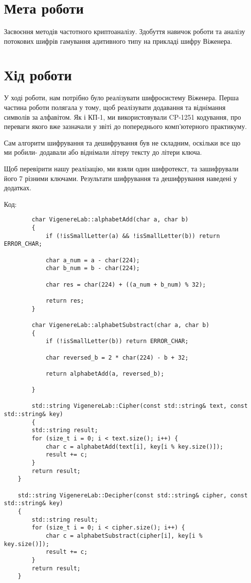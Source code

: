 \documentclass[12pt]{article}
\begin{document}


\section{Мета роботи}

Засвоєння методів частотного криптоаналізу. Здобуття навичок роботи та аналізу
потокових шифрів гамування адитивного типу на прикладі шифру Віженера.

\section{Хід роботи}

У ході роботи, нам потрібно було реалізувати шифросистему Віженера.
Перша частина роботи полягала у тому, щоб реалізувати додавання та віднімання
символів за алфавітом. Як і КП-1, ми використовували CP-1251 кодування, про переваги
якого вже зазначали у звіті до попереднього комп'ютерного практикуму.

Сам алгоритм шифрування та дешифрування був не складним, оскільки все що ми робили-
додавали або віднімали літеру тексту до літери ключа.

Щоб перевірити нашу реалізацію, ми взяли один шифротекст, та зашифрували його
7 різними ключами. Результати шифрування та дешифрування наведені у додатках.

Код:

\begin{verbatim}
        char VigenereLab::alphabetAdd(char a, char b)
        {
            if (!isSmallLetter(a) && !isSmallLetter(b)) return ERROR_CHAR;

            char a_num = a - char(224);
            char b_num = b - char(224);

            char res = char(224) + ((a_num + b_num) % 32);

            return res;
        }

        char VigenereLab::alphabetSubstract(char a, char b)
        {
            if (!isSmallLetter(b)) return ERROR_CHAR;

            char reversed_b = 2 * char(224) - b + 32;

            return alphabetAdd(a, reversed_b);

        }

        std::string VigenereLab::Cipher(const std::string& text, const std::string& key) 
        {
        std::string result;
        for (size_t i = 0; i < text.size(); i++) {
            char c = alphabetAdd(text[i], key[i % key.size()]);
            result += c;
        }
        return result;
    }

    std::string VigenereLab::Decipher(const std::string& cipher, const std::string& key) 
    {
        std::string result;
        for (size_t i = 0; i < cipher.size(); i++) {
            char c = alphabetSubstract(cipher[i], key[i % key.size()]);
            result += c;
        }
        return result;
    }
    \end{verbatim}
\end{document}
